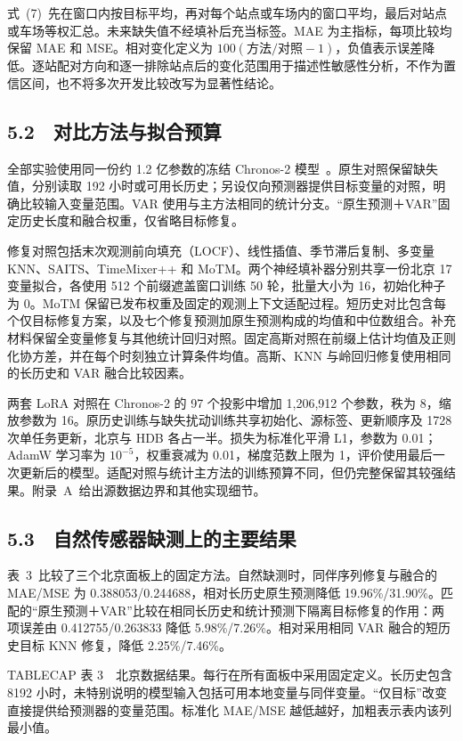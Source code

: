 式~(7)~先在窗口内按目标平均，再对每个站点或车场内的窗口平均，最后对站点或车场等权汇总。未来缺失值不经填补后充当标签。MAE 为主指标，每项比较均保留 MAE 和 MSE。相对变化定义为 $100(\text{方法}/\text{对照}-1)$，负值表示误差降低。逐站配对方向和逐一排除站点后的变化范围用于描述性敏感性分析，不作为置信区间，也不将多次开发比较改写为显著性结论。

\subsection{5.2　对比方法与拟合预算}

全部实验使用同一份约 1.2 亿参数的冻结 Chronos-2 模型~\citep{ansari2025chronos2}。原生对照保留缺失值，分别读取 192 小时或可用长历史；另设仅向预测器提供目标变量的对照，明确比较输入变量范围。VAR 使用与主方法相同的统计分支。“原生预测＋VAR”固定历史长度和融合权重，仅省略目标修复。

修复对照包括末次观测前向填充（LOCF）、线性插值、季节滞后复制、多变量 KNN、SAITS、TimeMixer++ 和 MoTM。两个神经填补器分别共享一份北京 17 变量拟合，各使用 512 个前缀遮盖窗口训练 50 轮，批量大小为 16，初始化种子为 0。MoTM 保留已发布权重及固定的观测上下文适配过程。短历史对比包含每个仅目标修复方案，以及七个修复预测加原生预测构成的均值和中位数组合。补充材料保留全变量修复与其他统计回归对照。固定高斯对照在前缀上估计均值及正则化协方差，并在每个时刻独立计算条件均值。高斯、KNN 与岭回归修复使用相同的长历史和 VAR 融合比较因素。

两套 LoRA 对照在 Chronos-2 的 97 个投影中增加 1,206,912 个参数，秩为 8，缩放参数为 16。原历史训练与缺失扰动训练共享初始化、源标签、更新顺序及 1728 次单任务更新，北京与 HDB 各占一半。损失为标准化平滑 L1，参数为 0.01；AdamW 学习率为 $10^{-5}$，权重衰减为 0.01，梯度范数上限为 1，评价使用最后一次更新后的模型。适配对照与统计主方法的训练预算不同，但仍完整保留其较强结果。附录~A~给出源数据边界和其他实现细节。

\subsection{5.3　自然传感器缺测上的主要结果}

表~3~比较了三个北京面板上的固定方法。自然缺测时，同伴序列修复与融合的 MAE/MSE 为 0.388053/0.244688，相对长历史原生预测降低 19.96\%/31.90\%。匹配的“原生预测＋VAR”比较在相同长历史和统计预测下隔离目标修复的作用：两项误差由 0.412755/0.263833 降低 5.98\%/7.26\%。相对采用相同 VAR 融合的短历史目标 KNN 修复，降低 2.25\%/7.46\%。



TABLECAP 表 3　北京数据结果。每行在所有面板中采用固定定义。长历史包含 8192 小时，未特别说明的模型输入包括可用本地变量与同伴变量。“仅目标”改变直接提供给预测器的变量范围。标准化 MAE/MSE 越低越好，加粗表示表内该列最小值。

